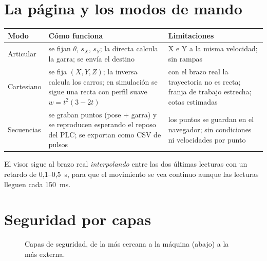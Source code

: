 \documentclass[a4paper,11pt]{article}
\begin{document}
\section{La página y los modos de mando}
\begin{center}\small
\begin{tabularx}{\linewidth}{>{\raggedright}p{2.4cm} >{\raggedright}X >{\raggedright\arraybackslash}X}
\toprule
\textbf{Modo} & \textbf{Cómo funciona} & \textbf{Limitaciones}\\
\midrule
Articular & se fijan $\theta$, $s_X$, $s_Y$; la directa calcula la garra; se envía el destino & X e Y a la misma velocidad; sin rampas\\
Cartesiano & se fija $(X,Y,Z)$; la inversa calcula los carros; en simulación se sigue una recta con perfil suave $w = t^2(3-2t)$ & con el brazo real la trayectoria no es recta; franja de trabajo estrecha; cotas estimadas\\
Secuencias & se graban puntos (pose + garra) y se reproducen esperando el reposo del PLC; se exportan como CSV de pulsos & los puntos se guardan en el navegador; sin condiciones ni velocidades por punto\\
\bottomrule
\end{tabularx}
\end{center}

El visor sigue al brazo real \emph{interpolando} entre las dos últimas lecturas con un retardo de 0,1--0,5~s, para que el movimiento se vea continuo aunque las lecturas lleguen cada 150~ms.

\section{Seguridad por capas}
\begin{figure}[H]
\centering
{}
\caption{Capas de seguridad, de la más cercana a la máquina (abajo) a la más externa.}
\end{figure}
\end{document}
